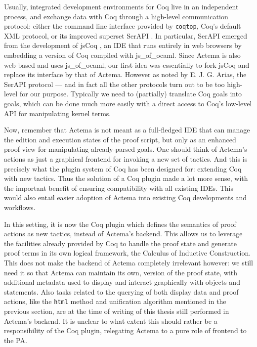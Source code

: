 Usually, integrated development environments for Coq live in an independent
process, and exchange data with Coq through a high-level communication protocol:
either the command line interface provided by \texttt{coqtop}, Coq's default XML
protocol, or its improved superset SerAPI .
In particular, SerAPI emerged from the development of jsCoq
, an IDE that runs entirely in web browsers by
embedding a version of Coq compiled with js\_of\_ocaml. Since Actema is also
web-based and uses js\_of\_ocaml, our first idea was essentially to fork jsCoq
and replace its interface by that of Actema. However as noted by E. J. G. Arias,
the SerAPI protocol --- and in fact all the other protocols turn out to be too
high-level for our purpose. Typically we need to (partially) translate Coq goals
into  goals, which can be done much more easily with a direct access to
Coq's low-level API for manipulating kernel terms.

Now, remember that Actema is not meant as a full-fledged IDE that can manage the
edition and execution states of the proof script, but only as an enhanced proof
view for manipulating already-parsed goals. One should think of Actema's actions
as just a graphical frontend for invoking a new set of tactics. And this is
precisely what the plugin system of Coq has been designed for: extending Coq
with new tactics. Thus the solution of a Coq plugin made a lot more sense, with
the important benefit of ensuring compatibility with all existing IDEs. This
would also entail easier adoption of Actema into existing Coq developments and
workflows.

In this setting, it is now the Coq plugin which defines the semantics of proof
actions as new tactics, instead of Actema's backend. This allows us to leverage
the facilities already provided by Coq to handle the proof state and generate
proof terms in its own logical framework, the Calculus of Inductive
Construction. This does not make the backend of Actema completely irrelevant
however: we still need it so that Actema can maintain its own, 
version of the proof state, with additional metadata used to display and
interact graphically with objects and statements. Also tasks related to the
querying of both display data and proof actions, like the \texttt{html} method
and unification algorithm mentioned in the previous section, are at the time of
writing of this thesis still performed in Actema's backend. It is unclear to
what extent this should rather be a responsibility of the Coq plugin, relegating
Actema to a pure role of frontend to the PA.

